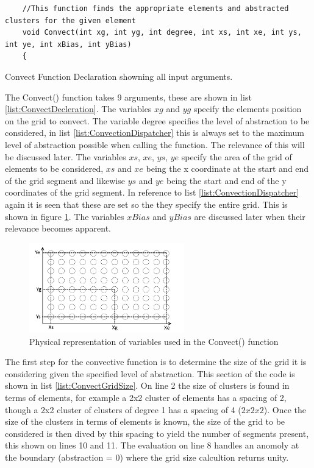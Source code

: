 \begin{listing}[H]
\begin{verbatim}
    //This function finds the appropriate elements and abstracted clusters for the given element 
    void Convect(int xg, int yg, int degree, int xs, int xe, int ys, int ye, int xBias, int yBias)
    {
\end{verbatim}
\caption{Convect Function Declaration showning all input arguments.}
\label{list:ConvectDecleration}
\end{listing}

The Convect() function takes 9 arguments, these are shown in list \ref{list:ConvectDecleration}. The variables $xg$ and $yg$ specify the elements position on the grid to convect. The variable degree specifies the level of abstraction to be considered, in list \ref{list:ConvectionDispatcher} this is always set to the maximum level of abstraction possible when calling the function. The relevance of this will be discussed later. The variables $xs$, $xe$, $ys$, $ye$ specify the area of the grid of elements to be considered, $xs$ and $xe$ being the x coordinate at the start and end of the grid segment and likewise $ys$ and $ye$ being the start and end of the y coordinates of the grid segment. In reference to list \ref{list:ConvectionDispatcher} again it is seen that these are set so the they specify the entire grid. This is shown in figure \ref{fig:GridNomenclature}. The variables $xBias$ and $yBias$ are discussed later when their relevance becomes apparent.
\begin{figure}[H]
\centering
\includegraphics[width=0.6\textwidth]{Figures/AbstractionGridExample.png}
\caption{\label{fig:GridNomenclature} Physical representation of variables used in the Convect() function}
\end{figure} 

The first step for the convective function is to determine the size of the grid it is considering given the specified level of abstraction. This section of the code is shown in list \ref{list:ConvectGridSize}. On line 2 the size of clusters is found in terms of elements, for example a 2x2 cluster of elements has a spacing of 2, though a 2x2 cluster of clusters of degree 1 has a spacing of 4 ($2x2x2$). Once the size of the clusters in terms of elements is known, the size of the grid to be considered is then dived by this spacing to yield the number of segments present, this shown on lines 10 and 11. The evaluation on line 8 handles an anomoly at the boundary (abstraction = 0) where the grid size calcultion returns unity.

